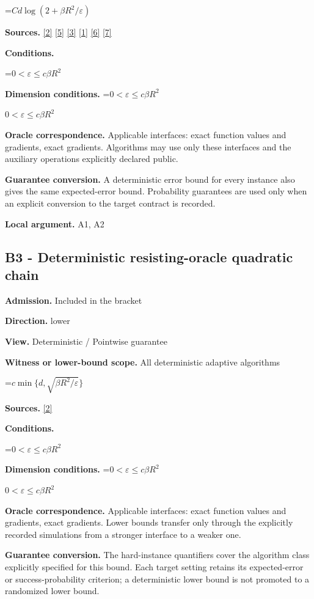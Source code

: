 \documentclass[10pt,a4paper]{article}
\newcommand{\AtlasMath}[1]{\par\begingroup\centering\setbox0=\hbox{$\displaystyle #1$}\ifdim\wd0>1.4\linewidth\typeout{ATLAS WIDE FORMULA: \the\wd0}\fi\ifdim\wd0>\linewidth\resizebox{\linewidth}{!}{\box0}\else\box0\fi\par\endgroup}
\newcommand{\AtlasInlineMath}[1]{\begingroup\setbox0=\hbox{$#1$}\ifdim\wd0>.4\linewidth\endgroup\AtlasMath{#1}\else\endgroup$#1$\fi}
\begin{document}
\AtlasMath{C d\log(2+\beta R^2/\varepsilon)}
\textbf{Sources.} \href{https://arxiv.org/pdf/2101.09740v2}{[2]} \href{https://arxiv.org/pdf/2609.33360v2}{[5]} \href{https://arxiv.org/pdf/2609.10874}{[3]} \href{https://arxiv.org/pdf/1405.4980}{[1]} \href{https://www2.isye.gatech.edu/~nemirovs/MOR_AccuracyCertificates.pdf}{[6]} \href{https://arxiv.org/pdf/2609.20701}{[7]}

\textbf{Conditions.} 
\AtlasMath{0<\varepsilon\le c\beta R^2}


\textbf{Dimension conditions.} \AtlasInlineMath{0<\varepsilon\le c\beta R^2}

\textbf{Oracle correspondence.} Applicable interfaces: exact function values and gradients, exact gradients. Algorithms may use only these interfaces and the auxiliary operations explicitly declared public.

\textbf{Guarantee conversion.} A deterministic error bound for every instance also gives the same expected-error bound. Probability guarantees are used only when an explicit conversion to the target contract is recorded.

\textbf{Local argument.} A1, A2

\subsection{B3 - Deterministic resisting-oracle quadratic chain}
\textbf{Admission.} Included in the bracket

\textbf{Direction.} lower

\textbf{View.} Deterministic / Pointwise guarantee

\textbf{Witness or lower-bound scope.} All deterministic adaptive algorithms

\AtlasMath{c\min\{d,\sqrt{\beta R^2/\varepsilon}\}}
\textbf{Sources.} \href{https://arxiv.org/pdf/2101.09740v2}{[2]}

\textbf{Conditions.} 
\AtlasMath{0<\varepsilon\le c\beta R^2}


\textbf{Dimension conditions.} \AtlasInlineMath{0<\varepsilon\le c\beta R^2}

\textbf{Oracle correspondence.} Applicable interfaces: exact function values and gradients, exact gradients. Lower bounds transfer only through the explicitly recorded simulations from a stronger interface to a weaker one.

\textbf{Guarantee conversion.} The hard-instance quantifiers cover the algorithm class explicitly specified for this bound. Each target setting retains its expected-error or success-probability criterion; a deterministic lower bound is not promoted to a randomized lower bound.
\end{document}
